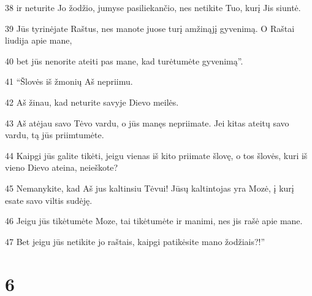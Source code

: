 \par 38 ir neturite Jo žodžio, jumyse pasiliekančio, nes netikite Tuo, kurį Jis siuntė. 
\par 39 Jūs tyrinėjate Raštus, nes manote juose turį amžinąjį gyvenimą. O Raštai liudija apie mane, 
\par 40 bet jūs nenorite ateiti pas mane, kad turėtumėte gyvenimą”. 
\par 41 “Šlovės iš žmonių Aš nepriimu. 
\par 42 Aš žinau, kad neturite savyje Dievo meilės. 
\par 43 Aš atėjau savo Tėvo vardu, o jūs manęs nepriimate. Jei kitas ateitų savo vardu, tą jūs priimtumėte. 
\par 44 Kaipgi jūs galite tikėti, jeigu vienas iš kito priimate šlovę, o tos šlovės, kuri iš vieno Dievo ateina, neieškote? 
\par 45 Nemanykite, kad Aš jus kaltinsiu Tėvui! Jūsų kaltintojas yra Mozė, į kurį esate savo viltis sudėję. 
\par 46 Jeigu jūs tikėtumėte Moze, tai tikėtumėte ir manimi, nes jis rašė apie mane. 
\par 47 Bet jeigu jūs netikite jo raštais, kaipgi patikėsite mano žodžiais?!”


\chapter{6}


